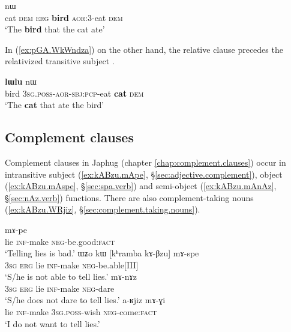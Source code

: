 \begin{exe}
\ex \label{ex:lWlu.nW.kW.tAkAndza}
 nɯ  \\
cat \textsc{dem} \textsc{erg} \textbf{bird} \textsc{aor}:3\flobv{}-eat \textsc{dem}   \\
\glt `The \textbf{bird} that the cat ate' 
\end{exe}

In (\ref{ex:pGA.WkWndza}) on the other hand, the relative clause precedes the relativized transitive subject .

\begin{exe}
\ex \label{ex:pGA.WkWndza}
 \textbf{lɯlu} nɯ   \\
bird \textsc{3sg}.\textsc{poss}-\textsc{aor}-\textsc{sbj}:\textsc{pcp}-eat \textbf{cat} \textsc{dem}  \\
\glt `The \textbf{cat} that ate the bird' 
\end{exe}

\subsection{Complement clauses}
Complement clauses in Japhug (chapter \ref{chap:complement.clauses}) occur in intransitive subject (\ref{ex:kABzu.mApe}, §\ref{sec:adjective.complement}), object (\ref{ex:kABzu.mAspe}, §\ref{sec:spa.verb}) and semi-object (\ref{ex:kABzu.mAnAz}, §\ref{sec:nAz.verb}) functions. There are also complement-taking nouns (\ref{ex:kABzu.WRjiz}, §\ref{sec:complement.taking.nouns}).

\begin{exe} 
\ex \label{ex:kABzu.complements}
\begin{xlist}
\ex \label{ex:kABzu.mApe}
 mɤ-pe \\
lie \textsc{inf}-make \textsc{neg}-be.good:\textsc{fact} \\
\glt `Telling lies is bad.' 
\ex \label{ex:kABzu.mAspe}
\gll ɯʑo kɯ [kʰramba kɤ-βzu] mɤ-spe \\
\textsc{3sg} \textsc{erg} lie \textsc{inf}-make \textsc{neg}-be.able[III] \\
\glt `S/he is not able to tell lies.' 
\ex \label{ex:kABzu.mAnAz}
 mɤ-nɤz \\
\textsc{3sg} \textsc{erg} lie \textsc{inf}-make \textsc{neg}-dare \\
\glt `S/he does not dare to tell lies.' 
\ex \label{ex:kABzu.WRjiz}
 a-ʁjiz mɤ-ɣi \\
lie \textsc{inf}-make \textsc{3sg}.\textsc{poss}-wish \textsc{neg}-come:\textsc{fact} \\
\glt `I do not want to tell lies.' 
\end{xlist}
\end{exe} 

